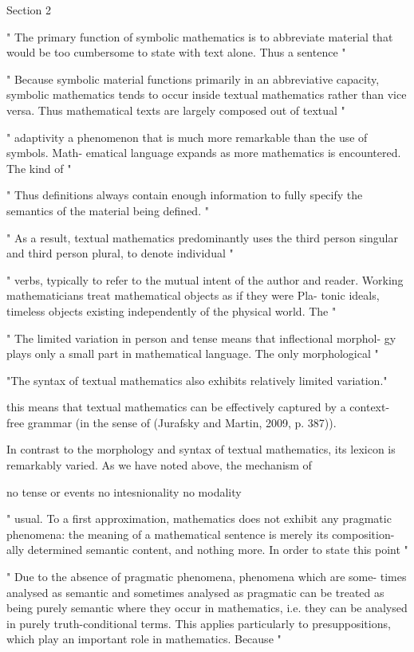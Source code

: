 Section 2

"
The primary function of symbolic mathematics is to abbreviate material
that would be too cumbersome to state with text alone. Thus a sentence
"

"
Because symbolic material functions primarily in an abbreviative capacity,
symbolic mathematics tends to occur inside textual mathematics rather than
vice versa. Thus mathematical texts are largely composed out of textual
"

"
adaptivity
a phenomenon that is much more remarkable than the use of symbols. Math-
ematical language expands as more mathematics is encountered. The kind of
"

"
Thus definitions always contain enough information to fully specify the
semantics of the material being defined.
"

"
As a result, textual mathematics predominantly
uses the third person singular and third person plural, to denote individual
"

"
verbs, typically to refer to the mutual intent of the author and reader.
Working mathematicians treat mathematical objects as if they were Pla-
tonic ideals, timeless objects existing independently of the physical world. The
"

"
The limited variation in person and tense means that inflectional morphol-
gy plays only a small part in mathematical language. The only morphological
"

"The syntax of textual mathematics also exhibits relatively limited variation."


this means that textual mathematics can be effectively captured by a context-
free grammar (in the sense of (Jurafsky and Martin, 2009, p. 387)).

In contrast to the morphology and syntax of textual mathematics, its
lexicon is remarkably varied. As we have noted above, the mechanism of

no tense or events
no intesnionality
no modality

"
usual. To a first approximation, mathematics does not exhibit any pragmatic
phenomena: the meaning of a mathematical sentence is merely its composition-
ally determined semantic content, and nothing more. In order to state this point
"


"
Due to the absence of pragmatic phenomena, phenomena which are some-
times analysed as semantic and sometimes analysed as pragmatic can be
treated as being purely semantic where they occur in mathematics, i.e. they
can be analysed in purely truth-conditional terms. This applies particularly
to presuppositions, which play an important role in mathematics. Because
"

